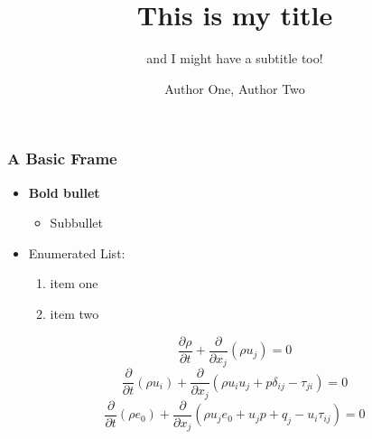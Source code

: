 \documentclass[aspectratio=1610]{beamer}
\begin{document}
\title{This is my title}
\subtitle{and I might have a subtitle too!}
\author{Author One, Author Two}
\begin{NCARtitleframe}
  \vspace{6em}
  \maketitle
\end{NCARtitleframe}



\begin{frame}
  \frametitle{A Basic Frame}

  \begin{itemize}
  \item \textbf{Bold bullet}
    \begin{itemize}
    \item Subbullet
    \end{itemize}
  \item Enumerated List:
    \begin{enumerate}
    \item item one
    \item item two
    \end{enumerate}
  \end{itemize}
  \begin{equation}
    \frac{\partial \rho}{\partial t} +
    \frac{\partial}{\partial x_{j}} (\rho u_{j}) = 0
  \end{equation}
  \begin{equation}
    \frac{\partial}{\partial t} (\rho u_{i}) +
    \frac{\partial}{\partial x_{j}} (\rho u_{i} u_{j} + p \delta_{ij} - \tau_{ji} )
    = 0
  \end{equation}
  \begin{equation}
    \frac{\partial}{\partial t} ( \rho e_{0} ) +
    \frac{\partial}{\partial x_{j}}
    ( \rho u_{j} e_{0} + u_{j} p + q_{j} - u_{i} \tau_{ij} ) = 0
  \end{equation}
\end{frame}
\end{document}
